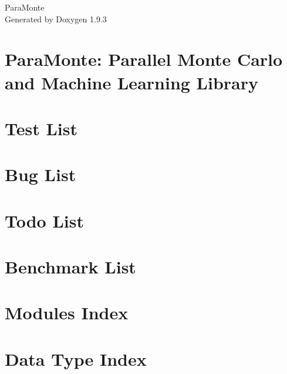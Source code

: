 \documentclass[twoside]{book}
\newcommand{\+}{\discretionary{\mbox{\scriptsize$\hookleftarrow$}}{}{}}
\newcommand{\clearemptydoublepage}{%
    \newpage{\pagestyle{empty}\cleardoublepage}%
  }
\begin{document}
  \raggedbottom
    \hypersetup{pageanchor=false,
                bookmarksnumbered=true,
                pdfencoding=unicode
               }
  \begin{titlepage}
  \vspace*{7cm}
  \begin{center}%
  {\Large Para\+Monte}\\
  \vspace*{1cm}
  {\large Generated by Doxygen 1.9.3}\\
  \end{center}
  \end{titlepage}
  \clearemptydoublepage
  \tableofcontents
  \clearemptydoublepage
  \hypersetup{pageanchor=true}
\chapter{Para\+Monte\+: Parallel Monte Carlo and Machine Learning Library}
\label{index}\hypertarget{index}{}
\chapter{Test List}
\label{test}

\chapter{Bug List}
\label{bug}

\chapter{Todo List}
\label{todo}

\chapter{Benchmark List}
\label{benchmarks}

\chapter{Modules Index}

\chapter{Data Type Index}

\end{document}
